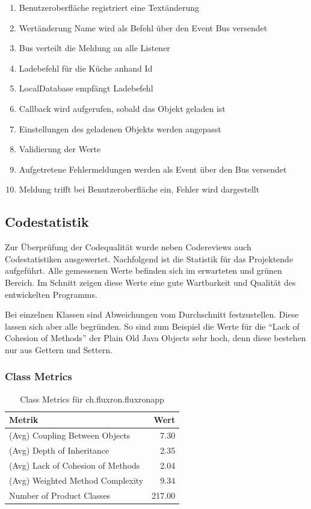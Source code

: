 \begin{enumerate}
\item{Benutzeroberfläche registriert eine Textänderung}
\item{Wertänderung Name wird als Befehl über den Event Bus versendet}
\item{Bus verteilt die Meldung an alle Listener}
\item{Ladebefehl für die Küche anhand Id}
\item{LocalDatabase empfängt Ladebefehl}
\item{Callback wird aufgerufen, sobald das Objekt geladen ist}
\item{Einstellungen des geladenen Objekts werden angepasst}
\item{Validierung der Werte}
\item{Aufgetretene Fehlermeldungen werden als Event über den Bus versendet}
\item{Meldung trifft bei Benutzeroberfläche ein, Fehler wird dargestellt}
\end{enumerate}

\subsection{Codestatistik}

Zur Überprüfung der Codequalität wurde neben Codereviews auch Codestatistiken ausgewertet. Nachfolgend ist die Statistik für das Projektende aufgeführt. Alle gemessenen Werte befinden sich im erwarteten und grünen Bereich. Im Schnitt zeigen diese Werte eine gute Wartbarkeit und Qualität des entwickelten Programms.

Bei einzelnen Klassen sind Abweichungen vom Durchschnitt festzustellen. Diese lassen sich aber alle begründen. So sind zum Beispiel die Werte für die \enquote{Lack of Cohesion of Methods} der Plain Old Java Objects sehr hoch, denn diese bestehen nur aus Gettern und Settern.

\subsubsection{Class Metrics}

\begin{table}[H]
	\begin{center}
	  \begin{tabular}{ | l | r | }
	    \hline
	    \textbf{Metrik} & \textbf{Wert} \\ \hline
	    (Avg) Coupling Between Objects & 7.30\\ \hline
   	    (Avg) Depth of Inheritance & 2.35 \\ \hline
   	    (Avg) Lack of Cohesion of Methods & 2.04 \\ \hline
  	    (Avg) Weighted Method Complexity & 9.34 \\ \hline
  	    Number of Product Classes & 217.00 \\ \hline
	  \end{tabular}
	  \caption{Class Metrics für ch.fluxron.fluxronapp}
  \end{center}
\end{table}

